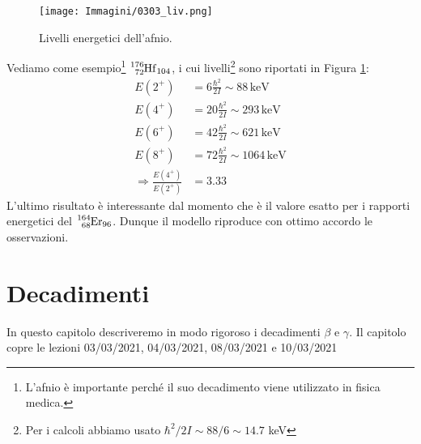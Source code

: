 \begin{figure}[h]
    \centering
    \texttt{[image: Immagini/0303\_liv.png]}
    \caption{Livelli energetici dell'afnio.}
    \label{0303_livel}
\end{figure}
\noindent Vediamo come esempio\footnote{L'afnio è importante perché il suo decadimento viene utilizzato in fisica medica.} $\ce{^{176}_{72}Hf_{104}}$, i cui livelli\footnote{Per i calcoli abbiamo usato $\hbar^2/2I \sim 88/6 \sim 14.7$ keV} sono riportati in Figura \ref{0303_livel}:
\begin{displaymath}
\begin{aligned}
E(2^+)&= 6\frac{\hbar^2}{2I}\sim 88\, \mbox{keV} \\
E(4^+)&= 20\frac{\hbar^2}{2I}\sim 293\, \mbox{keV} \\
E(6^+)&= 42\frac{\hbar^2}{2I}\sim 621\, \mbox{keV} \\
E(8^+)&= 72\frac{\hbar^2}{2I}\sim 1064\, \mbox{keV} \\
\Rightarrow \frac{E(4^+)}{E(2^+)}&= 3.33
\end{aligned}
\end{displaymath}
L'ultimo risultato è interessante dal momento che è il valore esatto per i rapporti energetici del $\ce{^{164}_{68}Er_{96}}$. Dunque il modello riproduce con ottimo accordo le osservazioni.


\chapter{Decadimenti}\label{sec-decadimenti}
In questo capitolo descriveremo in modo rigoroso i decadimenti $\beta$ e $\gamma$. Il capitolo copre le lezioni 03/03/2021, 04/03/2021, 08/03/2021 e 10/03/2021
